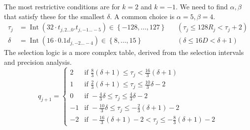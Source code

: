 \documentclass{article}
\DeclareMathOperator{\Int}{Int}
\begin{document}
The most restrictive conditions are for $k = 2$ and $k = -1$.
We need to find $\alpha, \beta$ that satisfy these for the smallest $\delta$.
A common choice is $\alpha = 5, \beta = 4$.
\begin{align}
  \label{eq:division:radix4_tau_val}
  \tau_j &= \Int(32 \cdot t_{j,2\ldots0}.t_{j,-1\ldots-5}) \in \left\{-128, \dots, 127\right\} && (\tau_j \leq 128 R_j < \tau_j + 2) \\
  \label{eq:division:radix4_delta_val}
  \delta &= \Int(16 \cdot 0.1d_{j,-2\ldots-4}) \in \left\{8, \dots, 15\right\} && (\delta \leq 16 D < \delta + 1)
\end{align}
The selection logic is a more complex table, derived from the selection intervals and precision analysis.
\begin{equation}
  \label{eq:division:radix4_logic_pos}
  q_{j+1} =
  \begin{cases}
    2  & \text{if } \frac{8}{3} (\delta + 1) \leq \tau_j < \frac{16}{3} (\delta + 1) \\
    1  & \text{if } \frac{2}{3} (\delta + 1) \leq \tau_j \leq \frac{10}{3} \delta - 2 \\
    0  & \text{if } -\frac{4}{3} \delta \leq \tau_j \leq \frac{4}{3} \delta - 2 \\
    -1 & \text{if } -\frac{10}{3} \delta \leq \tau_j \leq -\frac{2}{3} (\delta + 1) - 2 \\
    -2 & \text{if } -\frac{16}{3} (\delta + 1) - 2 < \tau_j \leq -\frac{8}{3} (\delta + 1) - 2
  \end{cases}
\end{equation}
\end{document}
